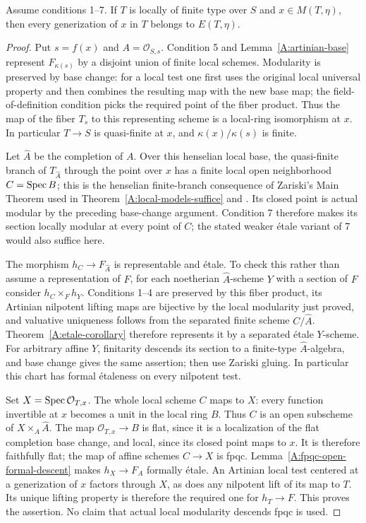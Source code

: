 \begin{proposition}
\label{A:actual-pro-generization}
Assume conditions 1--7.  If $T$ is locally of finite type over
$S$ and $x\in M(T,\eta)$, then every generization of $x$ in
$T$ belongs to $E(T,\eta)$.
\end{proposition}
\begin{proof}
Put $s=f(x)$ and $A=\mathcal O_{S,s}$.  Condition 5 and
Lemma~\ref{A:artinian-base} represent $F_{\kappa(s)}$ by a
disjoint union of finite local schemes.  Modularity is preserved
by base change: for a local test one first uses the original
local universal property and then combines the resulting map
with the new base map; the field-of-definition condition picks
the required point of the fiber product.  Thus the map of the
fiber $T_s$ to this representing scheme is a local-ring
isomorphism at $x$.  In particular $T\to S$ is quasi-finite
at $x$, and $\kappa(x)/\kappa(s)$ is finite.

Let $\widehat A$ be the completion of $A$.  Over this henselian
local base, the quasi-finite branch of $T_{\widehat A}$ through
the point over $x$ has a finite local open neighborhood
$C=\operatorname{Spec} B$; this is the henselian finite-branch consequence of
Zariski's Main Theorem used in
Theorem~\ref{A:local-models-suffice} and
\cite[Lemma 10.153.4(3)]{StacksHenselianBranches}.
Its closed point is actual modular by the preceding base-change
argument.  Condition 7 therefore makes its section locally
modular at every point of $C$; the stated weaker \'etale variant
of 7 would also suffice here.

The morphism $h_C\to F_{\widehat A}$ is representable and
\'etale.  To check this rather than assume a representation
of $F$, for each noetherian $\widehat A$-scheme $Y$ with a
section of $F$ consider $h_C\times_Fh_Y$.  Conditions 1--4
are preserved by this fiber product, its Artinian nilpotent
lifting maps are bijective by the local modularity just proved,
and valuative uniqueness follows from the separated finite
scheme $C/\widehat A$.  Theorem~\ref{A:etale-corollary}
therefore represents it by a separated \'etale $Y$-scheme.
For arbitrary affine $Y$, finitarity descends its section to a
finite-type $\widehat A$-algebra, and base change gives the
same assertion; then use Zariski gluing.  In particular this
chart has formal \'etaleness on every nilpotent test.

Set $X=\operatorname{Spec}\mathcal O_{T,x}$.  The whole local scheme $C$
maps to $X$: every function invertible at $x$ becomes a unit
in the local ring $B$.  Thus $C$ is an open subscheme of
$X\times_A\widehat A$.  The map
$\mathcal O_{T,x}\to B$ is flat, since it is a localization
of the flat completion base change, and local, since its closed
point maps to $x$.  It is therefore faithfully flat; the map
of affine schemes $C\to X$ is fpqc.
Lemma~\ref{A:fpqc-open-formal-descent} makes $h_X\to F_A$
formally \'etale.  An Artinian local test centered at a
generization of $x$ factors through $X$, as does any nilpotent
lift of its map to $T$.  Its unique lifting property is therefore
the required one for $h_T\to F$.  This proves the assertion.
No claim that actual local modularity descends fpqc is used.
\end{proof}

